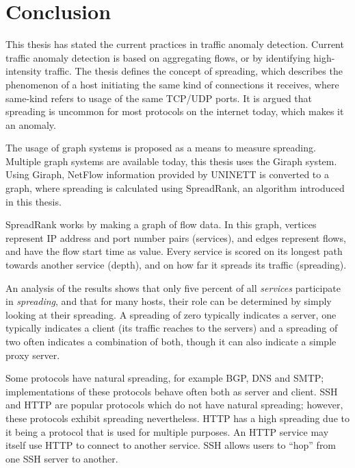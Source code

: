\chapter{Conclusion}
\label{chp:conclusion}

This thesis has stated the current practices in traffic anomaly detection.
Current traffic anomaly detection is based on aggregating flows,
 or by identifying high-intensity traffic.
The thesis defines the concept of spreading,
 which describes the phenomenon of a host initiating the same kind of connections it receives,
 where same-kind refers to usage of the same TCP/UDP ports.
It is argued that spreading is uncommon for most protocols on the internet today, which makes it an anomaly.

The usage of graph systems is proposed as a means to measure spreading.
Multiple graph systems are available today, this thesis uses the Giraph system.
Using Giraph, NetFlow information provided by UNINETT is converted to a graph,
 where spreading is calculated using SpreadRank, an algorithm introduced in this thesis.

SpreadRank works by making a graph of flow data.
In this graph, vertices represent IP address and port number pairs (\gls{service}s),
 and edges represent flows, and have the flow start time as value.
Every service is scored on its longest path towards another service (\gls{depth}),
 and on how far it spreads its traffic (\gls{spreading}).

An analysis of the results shows that only five percent of all \emph{\gls{service}s} participate in \emph{\gls{spreading}},
 and that for many hosts, their role can be determined by simply looking at their spreading.
A spreading of zero typically indicates a server, one typically indicates a client (its traffic reaches to the servers) and a spreading of two often indicates a combination of both, though it can also indicate a simple proxy server.

Some protocols have natural spreading, for example \gls{BGP}, \gls{DNS} and \gls{SMTP};
 implementations of these protocols behave often both as server and client.
\Gls{SSH} and \gls{HTTP} are popular protocols which do not have natural spreading;
 however, these protocols exhibit spreading nevertheless.
\Gls{HTTP} has a high \gls{spreading} due to it being a protocol that is used for multiple purposes.
An \gls{HTTP} \gls{service} may itself use \gls{HTTP} to connect to another \gls{service}.
\Gls{SSH} allows users to ``hop'' from one SSH server to another.


